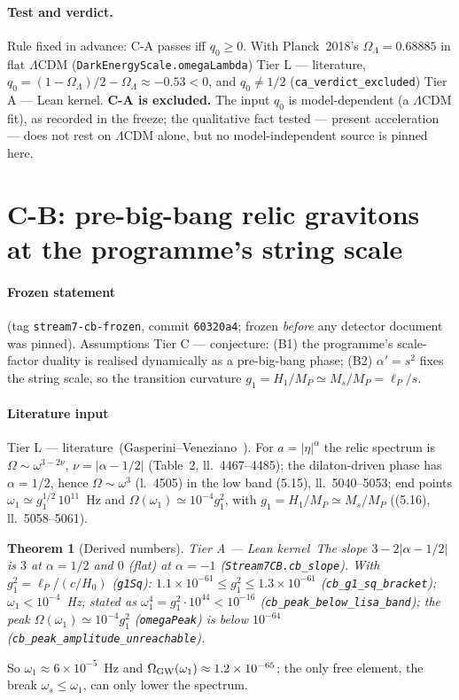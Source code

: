 \documentclass[11pt,a4paper]{article}
\newtheorem{theorem}{Theorem}[section]
\theoremstyle{remark}
\newcommand{\tierA}{\colorbox{green!15}{\textsf{\scriptsize Tier A --- Lean kernel}}}
\newcommand{\tierL}{\colorbox{blue!10}{\textsf{\scriptsize Tier L --- literature}}}
\newcommand{\tierC}{\colorbox{orange!15}{\textsf{\scriptsize Tier C --- conjecture}}}
\newcommand{\lean}[1]{\texttt{#1}}
\begin{document}
\paragraph{Test and verdict.} Rule fixed in advance: C-A passes iff $q_0\ge0$. With Planck~2018's
$\Omega_\Lambda=0.68885$ in flat $\Lambda$CDM (\lean{DarkEnergyScale.omegaLambda}) \tierL, $q_0=(1-\Omega_\Lambda)/2-
\Omega_\Lambda\approx-0.53<0$, and $q_0\neq1/2$ (\lean{ca\_verdict\_excluded}) \tierA. \textbf{C-A is excluded.} The
input $q_0$ is model-dependent (a $\Lambda$CDM fit), as recorded in the freeze; the qualitative fact tested ---
present acceleration --- does not rest on $\Lambda$CDM alone, but no model-independent source is pinned here.

\section{C-B: pre-big-bang relic gravitons at the programme's string scale}
\label{sec:cb}

\paragraph{Frozen statement} (tag \texttt{stream7-cb-frozen}, commit \texttt{60320a4}; frozen \emph{before} any
detector document was pinned). Assumptions \tierC: (B1) the programme's scale-factor duality is realised
dynamically as a pre-big-bang phase; (B2) $\alpha'=s^2$ fixes the string scale, so the transition curvature
$g_1=H_1/M_P\simeq M_s/M_P=\ell_P/s$.

\paragraph{Literature input} \tierL\ (Gasperini--Veneziano~\cite{GasperiniVeneziano2002}). For $a=|\eta|^\alpha$ the
relic spectrum is $\Omega\sim\omega^{3-2\nu}$, $\nu=|\alpha-1/2|$ (Table~2, ll.~4467--4485); the dilaton-driven
phase has $\alpha=1/2$, hence $\Omega\sim\omega^3$ (l.~4505) in the low band (5.15), ll.~5040--5053; end points
$\omega_1\simeq g_1^{1/2}\,10^{11}$~Hz and $\Omega(\omega_1)\simeq10^{-4}g_1^2$, with $g_1=H_1/M_P\simeq M_s/M_P$
((5.16), ll.~5058--5061).

\begin{theorem}[Derived numbers] \tierA\ \label{thm:cb}
The slope $3-2|\alpha-1/2|$ is $3$ at $\alpha=1/2$ and $0$ (flat) at $\alpha=-1$ (\lean{Stream7CB.cb\_slope}).
With $g_1^2=\ell_P/(c/H_0)$ (\lean{g1Sq}): $1.1\times10^{-61}\le g_1^2\le1.3\times10^{-61}$ (\lean{cb\_g1\_sq\_bracket});
$\omega_1<10^{-4}$~Hz, stated as $\omega_1^4=g_1^2\cdot10^{44}<10^{-16}$ (\lean{cb\_peak\_below\_lisa\_band}); the
peak $\Omega(\omega_1)\simeq10^{-4}g_1^2$ (\lean{omegaPeak}) is below $10^{-64}$ (\lean{cb\_peak\_amplitude\_unreachable}).
\end{theorem}
So $\omega_1\approx6\times10^{-5}$~Hz and $\Omega_{\rm GW}(\omega_1)\approx1.2\times10^{-65}$; the only free element,
the break $\omega_s\le\omega_1$, can only lower the spectrum.
\end{document}
